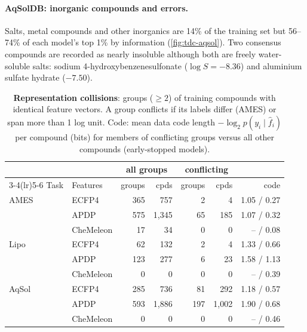 \documentclass[10pt,twocolumn,letterpaper]{article}
\theoremstyle{definition}
\begin{document}
\paragraph{AqSolDB: inorganic compounds and errors.} Salts, metal compounds and other inorganics are 14\% of the training set but 56--74\% of each model's top 1\% by information (\cref{fig:tdc-aqsol}). Two consensus compounds are recorded as nearly insoluble although both are freely water-soluble salts: sodium 4-hydroxybenzenesulfonate ($\log S=-8.36$) and aluminium sulfate hydrate ($-7.50$).

\begin{table}[t]
\centering\small
\setlength{\tabcolsep}{3pt}
\caption{\textbf{Representation collisions}: groups ($\ge2$) of training compounds with identical feature vectors. A group conflicts if its labels differ (AMES) or span more than 1 log unit. Code: mean data code length $-\log_2p(y_i\mid\hat f_i)$ per compound (bits) for members of conflicting groups versus all other compounds (early-stopped models).}\label{tab:collisions}
\begin{tabular}{@{}llrrrrr@{}}
\toprule
 & & \multicolumn{2}{c}{all groups} & \multicolumn{2}{c}{conflicting} & \\
\cmidrule(lr){3-4}\cmidrule(lr){5-6}
Task & Features & groups & cpds & groups & cpds & code\\
\midrule
AMES & ECFP4 & 365 & 757 & 2 & 4 & 1.05 / 0.27\\
 & APDP & 575 & 1{,}345 & 65 & 185 & 1.07 / 0.32\\
 & CheMeleon & 17 & 34 & 0 & 0 & -- / 0.08\\
Lipo & ECFP4 & 62 & 132 & 2 & 4 & 1.33 / 0.66\\
 & APDP & 123 & 277 & 6 & 23 & 1.58 / 1.13\\
 & CheMeleon & 0 & 0 & 0 & 0 & -- / 0.39\\
AqSol & ECFP4 & 285 & 736 & 81 & 292 & 1.18 / 0.57\\
 & APDP & 593 & 1{,}886 & 197 & 1{,}002 & 1.90 / 0.68\\
 & CheMeleon & 0 & 0 & 0 & 0 & -- / 0.46\\
\bottomrule
\end{tabular}
\end{table}
\end{document}
